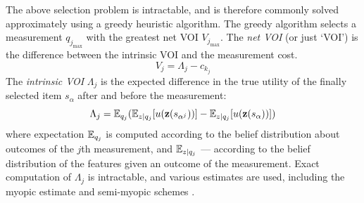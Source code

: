 The above selection problem is intractable, and is therefore commonly solved
approximately using a greedy heuristic algorithm. The greedy algorithm
selects a measurement $q_{j_{\max}}$ with the greatest net VOI
$V_{j_{\max}}$. The {\it net VOI} (or just `VOI') is the difference between the intrinsic VOI
and the measurement cost.
\begin{equation}
\label{eq:greedy-net-value}
V_j = \Lambda_j -c_{k_j}
\end{equation}
The {\it intrinsic VOI} $\Lambda_j$ is the expected
difference in the true utility of the finally selected item $s_\alpha$
after and before the measurement:
\begin{equation}
\label{eq:greedy-intrinsic-value}
\Lambda_j = \mathbb{E}_{q_j}(\mathbb{E}_{z|q_j}[u(\textbf{z}(s_{\alpha^j}))]-\mathbb{E}_{z|q_j}[u(\textbf{z}(s_\alpha))])
\end{equation}
where expectation $\mathbb{E}_{q_j}$ is computed according to the belief
distribution about outcomes of the $j$th measurement, and
$\mathbb{E}_{z|q_j}$ --- according to the belief distribution of the features
given an outcome of the measurement. Exact computation of $\Lambda_j$
is intractable, and various estimates are used, including the myopic
estimate \cite{Russell.right} and semi-myopic schemes
\cite{TolpinShimony.blinkered}.

